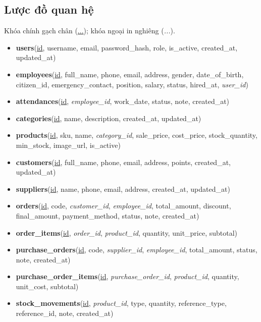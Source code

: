 \documentclass[12pt,a4paper]{report}
\begin{document}
\subsection{Lược đồ quan hệ}
Khóa chính gạch chân (\underline{...}); khóa ngoại in nghiêng (\textit{...}).
\begin{itemize}[leftmargin=1.2cm,nosep]
  \item \textbf{users}(\underline{id}, username, email, password\_hash, role, is\_active, created\_at, updated\_at)
  \item \textbf{employees}(\underline{id}, full\_name, phone, email, address, gender, date\_of\_birth, citizen\_id, emergency\_contact, position, salary, status, hired\_at, \textit{user\_id})
  \item \textbf{attendances}(\underline{id}, \textit{employee\_id}, work\_date, status, note, created\_at)
  \item \textbf{categories}(\underline{id}, name, description, created\_at, updated\_at)
  \item \textbf{products}(\underline{id}, sku, name, \textit{category\_id}, sale\_price, cost\_price, stock\_quantity, min\_stock, image\_url, is\_active)
  \item \textbf{customers}(\underline{id}, full\_name, phone, email, address, points, created\_at, updated\_at)
  \item \textbf{suppliers}(\underline{id}, name, phone, email, address, created\_at, updated\_at)
  \item \textbf{orders}(\underline{id}, code, \textit{customer\_id}, \textit{employee\_id}, total\_amount, discount, final\_amount, payment\_method, status, note, created\_at)
  \item \textbf{order\_items}(\underline{id}, \textit{order\_id}, \textit{product\_id}, quantity, unit\_price, subtotal)
  \item \textbf{purchase\_orders}(\underline{id}, code, \textit{supplier\_id}, \textit{employee\_id}, total\_amount, status, note, created\_at)
  \item \textbf{purchase\_order\_items}(\underline{id}, \textit{purchase\_order\_id}, \textit{product\_id}, quantity, unit\_cost, subtotal)
  \item \textbf{stock\_movements}(\underline{id}, \textit{product\_id}, type, quantity, reference\_type, reference\_id, note, created\_at)
\end{itemize}
\end{document}
